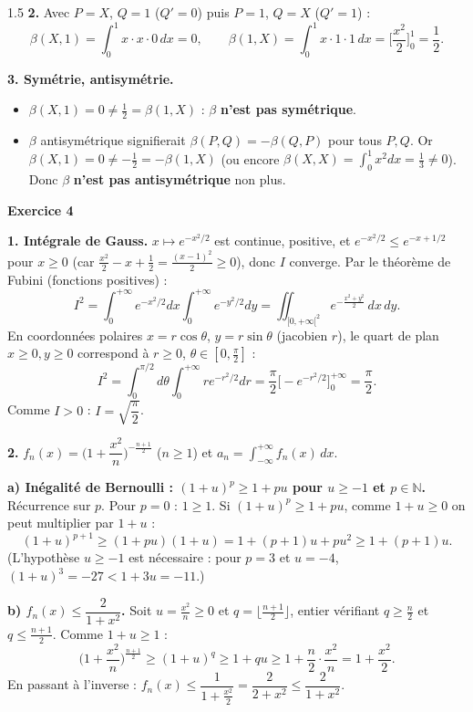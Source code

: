 \documentclass[12pt]{article}
\begin{document}
\begin{spacing}{1.5}
\textbf{2.} Avec $P=X$, $Q=1$ ($Q'=0$) puis $P=1$, $Q=X$ ($Q'=1$) :
\[
\beta(X,1)=\int_0^1x\cdot x\cdot0\,dx=\boxed{0},\qquad\beta(1,X)=\int_0^1x\cdot1\cdot1\,dx=\Big[\frac{x^2}{2}\Big]_0^1=\boxed{\frac12}.
\]

\textbf{3. Symétrie, antisymétrie.}
\begin{itemize}
\item $\beta(X,1)=0\neq\frac12=\beta(1,X)$ : $\beta$ \textbf{n'est pas symétrique}.
\item $\beta$ antisymétrique signifierait $\beta(P,Q)=-\beta(Q,P)$ pour tous $P,Q$. Or $\beta(X,1)=0\neq-\frac12=-\beta(1,X)$ (ou encore $\beta(X,X)=\int_0^1x^2dx=\frac13\neq0$). Donc $\beta$ \textbf{n'est pas antisymétrique} non plus.
\end{itemize}

\medskip\textbf{Exercice 4}

\textbf{1. Intégrale de Gauss.} $x\mapsto e^{-x^2/2}$ est continue, positive, et $e^{-x^2/2}\le e^{-x+1/2}$ pour $x\ge0$ (car $\frac{x^2}{2}-x+\frac12=\frac{(x-1)^2}{2}\ge0$), donc $I$ converge. Par le théorème de Fubini (fonctions positives) :
\[
I^2=\int_0^{+\infty}e^{-x^2/2}dx\int_0^{+\infty}e^{-y^2/2}dy=\iint_{[0,+\infty[^2}e^{-\frac{x^2+y^2}{2}}\,dx\,dy .
\]
En coordonnées polaires $x=r\cos\theta$, $y=r\sin\theta$ (jacobien $r$), le quart de plan $x\ge0,y\ge0$ correspond à $r\ge0$, $\theta\in[0,\frac\pi2]$ :
\[
I^2=\int_0^{\pi/2}d\theta\int_0^{+\infty}re^{-r^2/2}dr=\frac\pi2\Big[-e^{-r^2/2}\Big]_0^{+\infty}=\frac\pi2 .
\]
Comme $I>0$ : $\boxed{I=\sqrt{\dfrac\pi2}}$.

\textbf{2.} $f_n(x)=\Big(1+\dfrac{x^2}{n}\Big)^{-\frac{n+1}{2}}$ ($n\ge1$) et $a_n=\displaystyle\int_{-\infty}^{+\infty}f_n(x)\,dx$.


\textbf{a) Inégalité de Bernoulli : $(1+u)^p\ge1+pu$ pour $u\ge-1$ et $p\in\mathbb{N}$.} Récurrence sur $p$. Pour $p=0$ : $1\ge1$. Si $(1+u)^p\ge1+pu$, comme $1+u\ge0$ on peut multiplier par $1+u$ :
\[
(1+u)^{p+1}\ge(1+pu)(1+u)=1+(p+1)u+pu^2\ge1+(p+1)u .
\]
(L'hypothèse $u\ge-1$ est nécessaire : pour $p=3$ et $u=-4$, $(1+u)^3=-27<1+3u=-11$.)

\textbf{b) $f_n(x)\le\dfrac{2}{1+x^2}$.} Soit $u=\frac{x^2}{n}\ge0$ et $q=\big\lfloor\frac{n+1}{2}\big\rfloor$, entier vérifiant $q\ge\frac n2$ et $q\le\frac{n+1}{2}$. Comme $1+u\ge1$ :
\[
\Big(1+\frac{x^2}{n}\Big)^{\frac{n+1}{2}}\ge(1+u)^q\ge1+qu\ge1+\frac n2\cdot\frac{x^2}{n}=1+\frac{x^2}{2}.
\]
En passant à l'inverse : $f_n(x)\le\dfrac{1}{1+\frac{x^2}{2}}=\dfrac{2}{2+x^2}\le\dfrac{2}{1+x^2}$.


\end{spacing}
\end{document}
